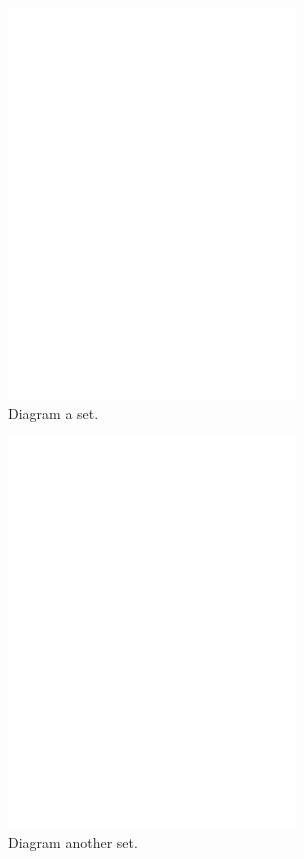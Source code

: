 \begin{figure}
	\centering
	\includegraphics[width=3in]{figures/shapes/blank.png}
    \caption[setblank]
	{Diagram a set.} 
\end{figure}

\begin{figure}
	\centering
	\includegraphics[width=3in]{figures/shapes/blank.png}
    \caption[setblank2]
	{Diagram another set.} 
\end{figure}
